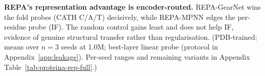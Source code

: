 \begin{table}[tbp]
\centering
\small
\setlength{\tabcolsep}{5pt}

\caption{\textbf{REPA's representation advantage is encoder-routed.} REPA-GearNet wins the fold probes (CATH C/A/T) decisively, while REPA-MPNN edges the per-residue probe (IF). The random control gains least and does not help IF, evidence of genuine structural transfer rather than regularisation. (PDB-trained; means over $n{=}3$ seeds at 1.0M; best-layer linear probe (protocol in Appendix~\ref{app:leakage}). Per-seed ranges and remaining variants in Appendix Table~\ref{tab:proteina-rep-full}.)}
\label{tab:proteina-rep}
\end{table}
